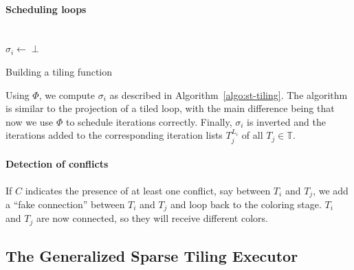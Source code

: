 \paragraph{Scheduling loops} 

\begin{algorithm}[t]
\nonl ~\\
$\sigma_i \gets \perp$\;
\caption{Building a tiling function}
\label{algo:st-tiling}
\end{algorithm}

Using $\Phi$, we compute $\sigma_i$ as described in Algorithm~\ref{algo:st-tiling}. The algorithm is similar to the projection of a tiled loop, with the main difference being that now we use $\Phi$ to schedule iterations correctly. Finally, $\sigma_i$ is inverted and the iterations added to the corresponding iteration lists $T_j^{L_i}$ of all $T_j \in \mathbb{T}$. 


\paragraph{Detection of conflicts}
If $C$ indicates the presence of at least one conflict, say between $T_i$ and $T_j$, we add a ``fake connection'' between $T_i$ and $T_j$ and loop back to the coloring stage. $T_i$ and $T_j$ are now connected, so they will receive different colors. 



\subsection{The Generalized Sparse Tiling Executor}

